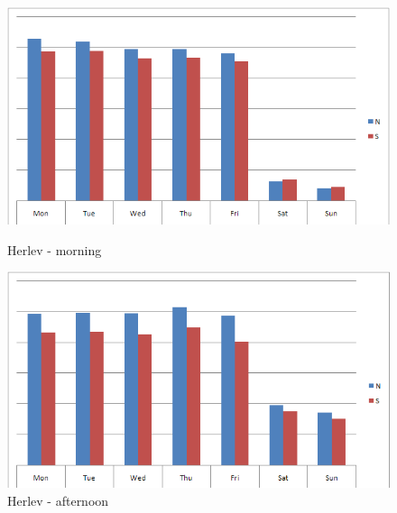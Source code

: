 \begin{figure}[ht]

    \begin{minipage}[b]{0.5\linewidth}

\begin{center}
\includegraphics[scale=0.25]{herlev_direction_proportions_morning.png} 
\end{center}
\caption{Herlev - morning}
\label{fig:herlev_props_morning}

    \end{minipage}
    \hspace{0.5cm}
    \begin{minipage}[b]{0.5\linewidth}

\begin{center}
\includegraphics[scale=0.25]{herlev_direction_proportions_afternoon.png} 
\end{center}
\caption{Herlev - afternoon}
\label{fig:herlev_props_afternoon}

    \end{minipage}

\end{figure}



